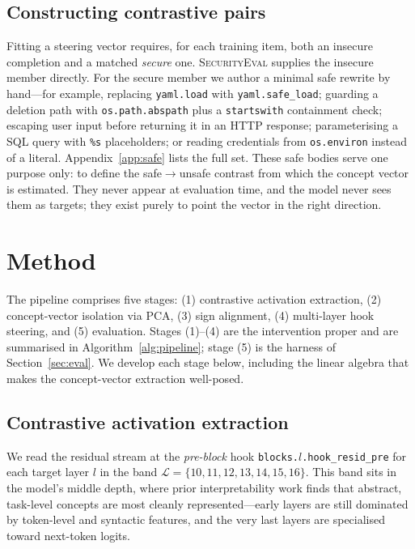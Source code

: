 \documentclass[11pt,a4paper]{article}
\begin{document}
\subsection{Constructing contrastive pairs}
Fitting a steering vector requires, for each training item, both an insecure completion and a matched \emph{secure} one. \textsc{SecurityEval} supplies the insecure member directly. For the secure member we author a minimal safe rewrite by hand---for example, replacing \texttt{yaml.load} with \texttt{yaml.safe\_load}; guarding a deletion path with \texttt{os.path.abspath} plus a \texttt{startswith} containment check; escaping user input before returning it in an HTTP response; parameterising a SQL query with \texttt{\%s} placeholders; or reading credentials from \texttt{os.environ} instead of a literal. Appendix~\ref{app:safe} lists the full set. These safe bodies serve one purpose only: to define the safe$\rightarrow$unsafe contrast from which the concept vector is estimated. They never appear at evaluation time, and the model never sees them as targets; they exist purely to point the vector in the right direction.

\section{Method}
\label{sec:method}

The pipeline comprises five stages: (1) contrastive activation extraction, (2) concept-vector isolation via PCA, (3) sign alignment, (4) multi-layer hook steering, and (5) evaluation. Stages (1)--(4) are the intervention proper and are summarised in Algorithm~\ref{alg:pipeline}; stage (5) is the harness of Section~\ref{sec:eval}. We develop each stage below, including the linear algebra that makes the concept-vector extraction well-posed.

\subsection{Contrastive activation extraction}
\label{sec:extract}
We read the residual stream at the \emph{pre-block} hook \texttt{blocks.$l$.hook\_resid\_pre} for each target layer $l$ in the band $\mathcal{L} = \{10, 11, 12, 13, 14, 15, 16\}$. This band sits in the model's middle depth, where prior interpretability work finds that abstract, task-level concepts are most cleanly represented---early layers are still dominated by token-level and syntactic features, and the very last layers are specialised toward next-token logits.
\end{document}
